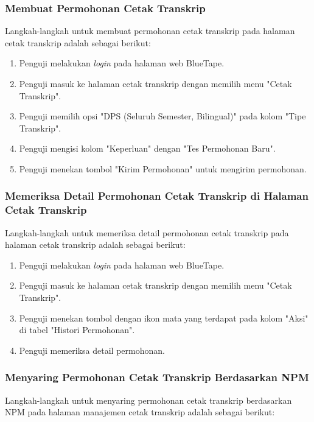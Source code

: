 \subsubsection{Membuat Permohonan Cetak Transkrip}
\label{subsubsec:skenario_membuat_permohonan_cetak_transkrip}
Langkah-langkah untuk membuat permohonan cetak transkrip pada halaman cetak transkrip adalah sebagai berikut:

\begin{enumerate}
    \item Penguji melakukan \textit{login} pada halaman web BlueTape.
    \item Penguji masuk ke halaman cetak transkrip dengan memilih menu "Cetak Transkrip".
    \item Penguji memilih opsi "DPS (Seluruh Semester, Bilingual)" pada kolom "Tipe Transkrip".
    \item Penguji mengisi kolom "Keperluan" dengan "Tes Permohonan Baru".
    \item Penguji menekan tombol "Kirim Permohonan" untuk mengirim permohonan.
\end{enumerate}

\subsubsection{Memeriksa Detail Permohonan Cetak Transkrip di Halaman Cetak Transkrip}
\label{subsubsec:skenario_memeriksa_detail_permohonan_cetak_transkrip_di_halaman_cetak_transkrip}
Langkah-langkah untuk memeriksa detail permohonan cetak transkrip pada halaman cetak transkrip adalah sebagai berikut:

\begin{enumerate}
    \item Penguji melakukan \textit{login} pada halaman web BlueTape.
    \item Penguji masuk ke halaman cetak transkrip dengan memilih menu "Cetak Transkrip".
    \item Penguji menekan tombol dengan ikon mata yang terdapat pada kolom "Aksi" di tabel "Histori Permohonan".
    \item Penguji memeriksa detail permohonan.
\end{enumerate}

\subsubsection{Menyaring Permohonan Cetak Transkrip Berdasarkan NPM}
\label{subsubsec:skenario_menyaring_permohonan_cetak_transkrip_berdasarkan_npm}
Langkah-langkah untuk menyaring permohonan cetak transkrip berdasarkan NPM pada halaman manajemen cetak transkrip adalah sebagai berikut:

